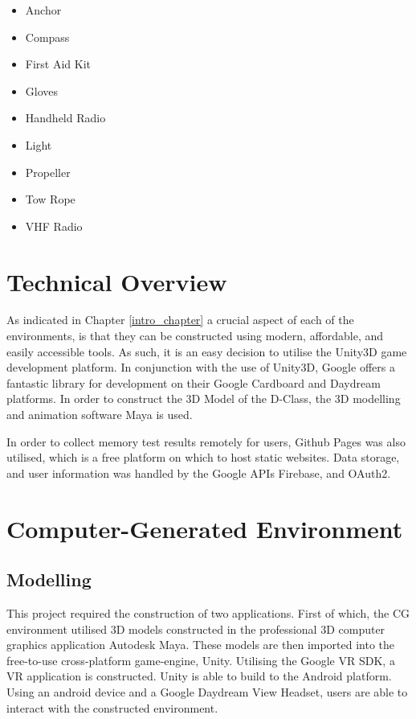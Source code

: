 \documentclass[ %
                    author={Elis Jones},
                supervisor={Dr. Kirsten Cater},
                    degree={BSc},
                     title={The Effect of Presentation Medium on Spatial Cognition},
                  subtitle={in the Virtual Environment},
                      year={2018} ]{dissertation}
\begin{document}
\begin{itemize}
    \item Anchor
    \item Compass
    \item First Aid Kit
    \item Gloves
    \item Handheld Radio
    \item Light
    \item Propeller
    \item Tow Rope
    \item VHF Radio
\end{itemize}

\section{Technical Overview}
As indicated in Chapter \ref{intro_chapter} a crucial aspect of each of the environments, is that they can be constructed using modern, affordable, and easily accessible tools. As such, it is an easy decision to utilise the Unity3D game development platform. In conjunction with the use of Unity3D, Google offers a fantastic library for development on their Google Cardboard and Daydream platforms. In order to construct the 3D Model of the D-Class, the 3D modelling and animation software Maya is used. 

In order to collect memory test results remotely for users, Github Pages was also utilised, which is a free platform on which to host static websites. Data storage, and user information was handled by the Google APIs Firebase, and OAuth2.

\section{Computer-Generated Environment}
\subsection{Modelling}
This project required the construction of two applications. First of which, the CG environment utilised 3D models constructed in the professional 3D computer graphics application Autodesk Maya. These models are then imported into the free-to-use cross-platform game-engine, Unity. Utilising the Google VR SDK, a VR application is constructed. Unity is able to build to the Android platform. Using an android device and a Google Daydream View Headset, users are able to interact with the constructed environment.
\end{document}
